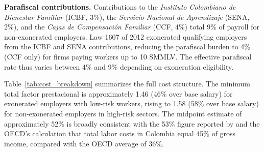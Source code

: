 \documentclass{article}
\begin{document}
\textbf{Parafiscal contributions.} Contributions to the \textit{Instituto Colombiano de Bienestar Familiar} (ICBF, 3\%), the \textit{Servicio Nacional de Aprendizaje} (SENA, 2\%), and the \textit{Cajas de Compensaci\'on Familiar} (CCF, 4\%) total 9\% of payroll for non-exonerated employers. Law 1607 of 2012 exonerated qualifying employers from the ICBF and SENA contributions, reducing the parafiscal burden to 4\% (CCF only) for firms paying workers up to 10 SMMLV. The effective parafiscal rate thus varies between 4\% and 9\% depending on exoneration eligibility.

Table~\ref{tab:cost_breakdown} summarizes the full cost structure. The minimum total factor prestacional is approximately 1.46 (46\% over base salary) for exonerated employers with low-risk workers, rising to 1.58 (58\% over base salary) for non-exonerated employers in high-risk sectors. The midpoint estimate of approximately 52\% is broadly consistent with the 53\% figure reported by \cite{anif2018} and the OECD's calculation that total labor costs in Colombia equal 45\% of gross income, compared with the OECD average of 36\%.
\end{document}
